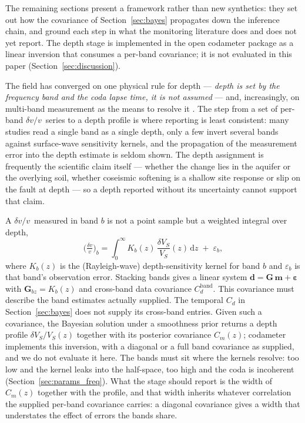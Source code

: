 \documentclass[
  referee]{gji}
\providecommand{\dvv}{\ensuremath{\delta v/v}}
\begin{document}
The remaining sections present a framework rather than new synthetics:
they set out how the covariance of Section~\ref{sec:bayes} propagates
down the inference chain, and ground each step in what the monitoring
literature does and does not yet report. The depth stage is implemented
in the open codameter package as a linear inversion that consumes a
per-band covariance; it is not evaluated in this paper
(Section~\ref{sec:discussion}).

The field has converged on one physical rule for depth --- \emph{depth
is set by the frequency band and the coda lapse time, it is not assumed}
\citep{Obermann2013, Obermann2016} --- and, increasingly, on multi-band
measurement as the means to resolve it
\citep{Takano2017, Feng2020, Mao2022, Mao2025}. The step from a set of
per-band \dvv~series to a depth profile is where reporting is least
consistent: many studies read a single band as a single depth, only a
few invert several bands against surface-wave sensitivity kernels, and
the propagation of the measurement error into the depth estimate is
seldom shown. The depth assignment is frequently the scientific claim
itself --- whether the change lies in the aquifer or the overlying soil,
whether coseismic softening is a shallow site response or slip on the
fault at depth \citep{Rubinstein2005} --- so a depth reported without
its uncertainty cannot support that claim.

A \dvv~measured in band \(b\) is not a point sample but a weighted
integral over depth, \begin{equation}
\Big(\tfrac{\delta v}{v}\Big)_b = \int_0^\infty K_b(z)\,\frac{\delta V_S}{V_S}(z)\,\mathrm{d}z \;+\; \varepsilon_b,
\label{eq:kernel}
\end{equation} where \(K_b(z)\) is the (Rayleigh-wave) depth-sensitivity
kernel for band \(b\) and \(\varepsilon_b\) is that band's observation
error. Stacking bands gives a linear system
\(\mathbf{d}=\mathbf{G}\,\mathbf{m}+\boldsymbol\varepsilon\) with
\(\mathbf{G}_{bz}=K_b(z)\) and cross-band data covariance
\(C_d^{\mathrm{band}}\). This covariance must describe the band
estimates actually supplied. The temporal \(C_d\) in
Section~\ref{sec:bayes} does not supply its cross-band entries. Given
such a covariance, the Bayesian solution under a smoothness prior
returns a depth profile \(\delta V_S/V_S(z)\) together with its
posterior covariance \(C_m(z)\); codameter implements this inversion,
with a diagonal or a full band covariance as supplied, and we do not
evaluate it here. The bands must sit where the kernels resolve: too low
and the kernel leaks into the half-space, too high and the coda is
incoherent (Section~\ref{sec:params_freq}). What the stage should report
is the width of \(C_m(z)\) together with the profile, and that width
inherits whatever correlation the supplied per-band covariance carries:
a diagonal covariance gives a width that understates the effect of
errors the bands share.
\end{document}
